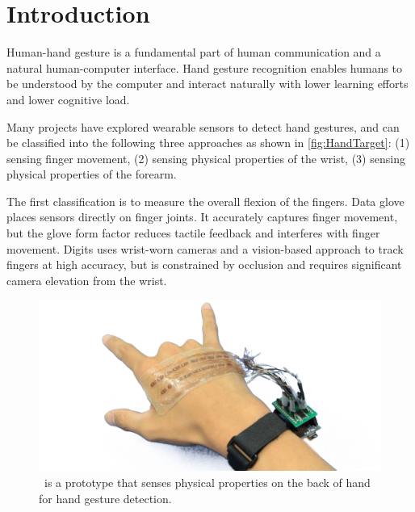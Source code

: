 \documentclass{sigchi}
\begin{document}



\section{Introduction}
Human-hand gesture is a fundamental part of human communication and a natural human-computer interface. Hand gesture recognition enables humans to be understood by the computer and interact naturally with lower learning efforts and lower cognitive load.

Many projects have explored wearable sensors to detect hand gestures, and can be classified into the following three approaches as shown in \autoref{fig:HandTarget}: (1) sensing finger movement, (2) sensing physical properties of the wrist, (3) sensing physical properties of the forearm.

The first classification is to measure the overall flexion of the fingers. Data glove \cite{4539650} places sensors directly on finger joints. It accurately captures finger movement, but the glove form factor reduces tactile feedback and interferes with finger movement. Digits \cite{Kim:2012:DFI:2380116.2380139} uses wrist-worn cameras and a vision-based approach to track fingers at high accuracy, but is constrained by occlusion and requires significant camera elevation from the wrist. 

\begin{figure}
  \begin{center}
  \includegraphics[width=1\columnwidth]{figures/BackHand.jpg}
  \caption{\getTitleName\ is a prototype that senses physical properties on the back of hand for hand gesture detection.}
  \label{fig:FIGURE1}
  \end{center}
\end{figure}
\end{document}
